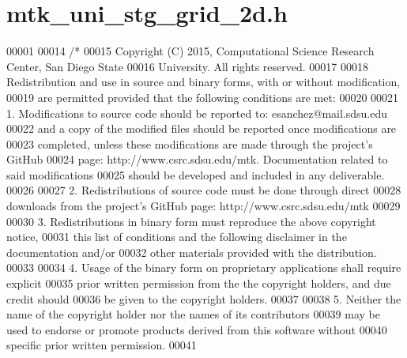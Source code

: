 \hypertarget{mtk__uni__stg__grid__2d_8h_source}{\section{mtk\+\_\+uni\+\_\+stg\+\_\+grid\+\_\+2d.\+h}
\label{mtk__uni__stg__grid__2d_8h_source}
}

\begin{DoxyCode}
00001 
00014 \textcolor{comment}{/*}
00015 \textcolor{comment}{Copyright (C) 2015, Computational Science Research Center, San Diego State}
00016 \textcolor{comment}{University. All rights reserved.}
00017 \textcolor{comment}{}
00018 \textcolor{comment}{Redistribution and use in source and binary forms, with or without modification,}
00019 \textcolor{comment}{are permitted provided that the following conditions are met:}
00020 \textcolor{comment}{}
00021 \textcolor{comment}{1. Modifications to source code should be reported to: esanchez@mail.sdsu.edu}
00022 \textcolor{comment}{and a copy of the modified files should be reported once modifications are}
00023 \textcolor{comment}{completed, unless these modifications are made through the project's GitHub}
00024 \textcolor{comment}{page: http://www.csrc.sdsu.edu/mtk. Documentation related to said modifications}
00025 \textcolor{comment}{should be developed and included in any deliverable.}
00026 \textcolor{comment}{}
00027 \textcolor{comment}{2. Redistributions of source code must be done through direct}
00028 \textcolor{comment}{downloads from the project's GitHub page: http://www.csrc.sdsu.edu/mtk}
00029 \textcolor{comment}{}
00030 \textcolor{comment}{3. Redistributions in binary form must reproduce the above copyright notice,}
00031 \textcolor{comment}{this list of conditions and the following disclaimer in the documentation and/or}
00032 \textcolor{comment}{other materials provided with the distribution.}
00033 \textcolor{comment}{}
00034 \textcolor{comment}{4. Usage of the binary form on proprietary applications shall require explicit}
00035 \textcolor{comment}{prior written permission from the the copyright holders, and due credit should}
00036 \textcolor{comment}{be given to the copyright holders.}
00037 \textcolor{comment}{}
00038 \textcolor{comment}{5. Neither the name of the copyright holder nor the names of its contributors}
00039 \textcolor{comment}{may be used to endorse or promote products derived from this software without}
00040 \textcolor{comment}{specific prior written permission.}
00041 \textcolor{comment}{}

\end{DoxyCode}
